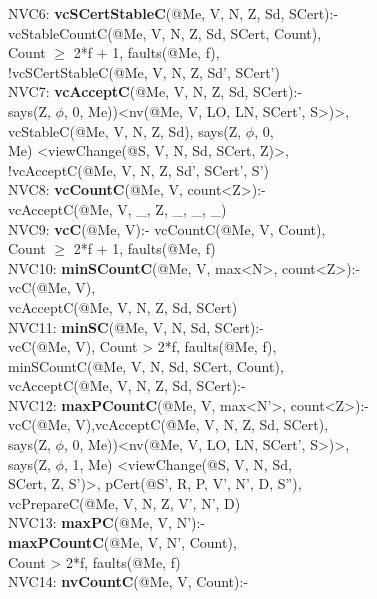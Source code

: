 \begin{code}
NVC6: \textbf{vcSCertStableC}(@Me, V, N, Z, Sd, SCert):-\\
\> vcStableCountC(@Me, V, N, Z, Sd, SCert, Count),\\
\> Count $\geq$ 2*f + 1, faults(@Me, f),\\
\> !vcSCertStableC(@Me, V, N, Z, Sd', SCert')\\
NVC7: \textbf{vcAcceptC}(@Me, V, N, Z, Sd, SCert):-\\
\> says(Z, $\phi$, 0, Me))<nv(@Me, V, LO, LN, SCert', S>)>,\\
\> vcStableC(@Me, V, N, Z, Sd), says(Z, $\phi$, 0, \\
\> Me) <viewChange(@S, V, N, Sd, SCert, Z)>,\\
\> !vcAcceptC(@Me, V, N, Z, Sd', SCert', S')\\
NVC8: \textbf{vcCountC}(@Me, V, count<Z>):-\\
\> vcAcceptC(@Me, V, \_, Z, \_, \_, \_)\\
NVC9: \textbf{vcC}(@Me, V):- vcCountC(@Me, V, Count),\\
\> Count $\geq$ 2*f + 1, faults(@Me, f)\\
NVC10: \textbf{minSCountC}(@Me, V, max<N>, count<Z>):- \\
\> vcC(@Me, V),\\
\> vcAcceptC(@Me, V, N, Z, Sd, SCert)\\
NVC11: \textbf{minSC}(@Me, V, N, Sd, SCert):- \\
\> vcC(@Me, V), Count > 2*f, faults(@Me, f),\\
\> minSCountC(@Me, V, N, Sd, SCert, Count), \\
\> vcAcceptC(@Me, V, N, Z, Sd, SCert):-\\
NVC12: \textbf{maxPCountC}(@Me, V, max<N'>, count<Z>):- \\
\> vcC(@Me, V),vcAcceptC(@Me, V, N, Z, Sd, SCert),\\
\> says(Z, $\phi$, 0, Me))<nv(@Me, V, LO, LN, SCert', S>)>,\\
\> says(Z, $\phi$, 1, Me) <viewChange(@S, V, N, Sd, \\
\> SCert, Z, S')>, pCert(@S', R, P, V', N', D, S''),\\
\> vcPrepareC(@Me, V, N, Z, V', N', D)\\
NVC13: \textbf{maxPC}(@Me, V, N'):- \\
\> \textbf{maxPCountC}(@Me, V, N', Count),\\
\> Count > 2*f, faults(@Me, f)\\
NVC14: \textbf{nvCountC}(@Me, V, Count):-\\

\end{code}
